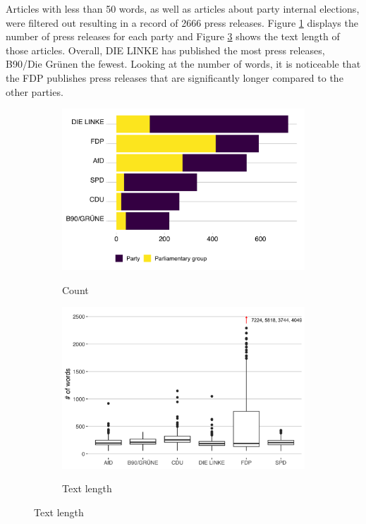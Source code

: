 \documentclass[12pt,a4paper,notitlepage]{article}
\begin{document}
Articles with less than 50 words, as well as articles about party internal elections, were filtered out resulting in a record of 2666 press releases. Figure \ref{fig_press} displays the number of press releases for each party and Figure \ref{fig_press_textlength} shows the text length of those articles. Overall, DIE LINKE has published the most press releases, B90/Die Grünen the fewest. Looking at the number of words, it is noticeable that the FDP publishes press releases that are significantly longer compared to the other parties.

\begin{figure}[H]
	\begin{center}
	\caption{Press releases}
		\begin{subfigure}[normla]{0.39\textwidth}
			\caption{Count}
			\includegraphics[width=\textwidth]{../figs/press_releases}
			\label{fig_press}
		\end{subfigure}
		\begin{subfigure}[normla]{0.59\textwidth}
			\caption{Text length}
			\includegraphics[width=\textwidth]{../figs/press_releases_textlength}
			\label{fig_press_textlength}
		\end{subfigure}
	\end{center}
\end{figure}
\end{document}

